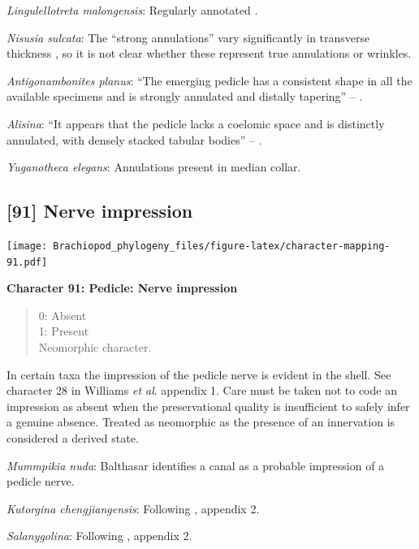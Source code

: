 \documentclass[]{book}
\theoremstyle{definition}
\theoremstyle{definition}
\theoremstyle{definition}
\theoremstyle{remark}
\begin{document}
\emph{Lingulellotreta malongensis}: Regularly annotated \citep[see fig.
14.9 in][]{Hou2017Brachiopoda}.

\emph{Nisusia sulcata}: The ``strong annulations'' vary significantly in
transverse thickness \citep{Holmer2018Evolutionarysignificance}, so it
is not clear whether these represent true annulations or wrinkles.

\emph{Antigonambonites planus}: ``The emerging pedicle has a consistent
shape in all the available specimens and is strongly annulated and
distally tapering'' -- \citet{Holmer2018Evolutionarysignificance}.

\emph{Alisina}: ``It appears that the pedicle lacks a coelomic space and
is distinctly annulated, with densely stacked tabular bodies'' --
\citet{Zhang2011Anobolellate}.

\emph{Yuganotheca elegans}: Annulations present in median collar.

\hypertarget{nerve-impression}{%
\subsection*{{[}91{]} Nerve impression}\label{nerve-impression}}

\texttt{[image: Brachiopod\_phylogeny\_files/figure-latex/character-mapping-91.pdf]}

\textbf{Character 91: Pedicle: Nerve impression}

\begin{quote}
0: Absent\\
1: Present\\
Neomorphic character.
\end{quote}

In certain taxa the impression of the pedicle nerve is evident in the
shell. See character 28 in Williams \emph{et al}.
\citeyearpar{Williams1998Thediversity} appendix 1. Care must be taken
not to code an impression as absent when the preservational quality is
insufficient to safely infer a genuine absence. Treated as neomorphic as
the presence of an innervation is considered a derived state.

\emph{Mummpikia nuda}: Balthasar
\citeyearpar[p.~274]{Balthasar2008iMummpikia} identifies a canal as a
probable impression of a pedicle nerve.

\emph{Kutorgina chengjiangensis}: Following
\citet{Williams1998Thediversity}, appendix 2.

\emph{Salanygolina}: Following \citet{Williams1998Thediversity},
appendix 2.
\end{document}
